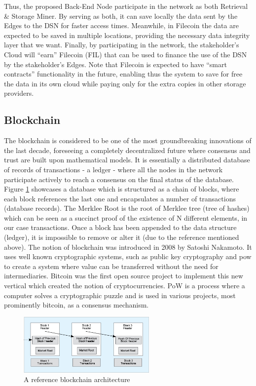Thus, the proposed Back-End Node participate in the network as both Retrieval \& Storage Miner. By serving as both, it can save locally the data sent by the Edges to the DSN for faster access times. Meanwhile, in Filecoin the data are expected to be saved in multiple locations, providing the necessary data integrity layer that we want. Finally, by participating in the network, the stakeholder’s Cloud will “earn” Filecoin (FIL) that can be used to finance the use of the DSN by the stakeholder’s Edges. Note that Filecoin is expected to have “smart contracts” functionality in the future, enabling thus the system to save for free the data in its own cloud while paying only for the extra copies in other storage providers.

\subsection{Blockchain}

The blockchain is considered to be one of the most groundbreaking innovations of the last decade, foreseeing a completely decentralized future where consensus and \gls{trust} are built upon mathematical models. It is essentially a distributed database of records of transactions - a ledger - where all the nodes in the network participate actively to reach a consensus on the final status of the database. Figure \ref{fig:blockchain} showcases a database which is structured as a chain of blocks, where each block references the last one and encapsulates a number of transactions (database records).  The Merklee Root is the root of Merklee tree (tree of hashes) which can be seen as a succinct proof of the existence of N different elements, in our case transactions. Once a block has been appended to the data structure (ledger), it is impossible to remove or alter it (due to the reference mentioned above). The notion of blockchain  was introduced in 2008 by Satoshi Nakamoto\cite{bitcoin}. It uses well known cryptographic systems, such as public key cryptography\cite{pubkey} and \acrfull{pow}\cite{bitcoin} to create a system where value can be transferred without the need for intermediaries. Bitcoin was the first open source project to implement this new vertical which created the notion of cryptocurrencies. PoW is a process where a computer solves a cryptographic puzzle and is used in various projects, most prominently bitcoin, as a consensus mechanism.

\begin{figure}[h]
    \centering
    \includegraphics[width=0.6\textwidth]{images/blockchain.jpg}
    \caption{A reference blockchain architecture\cite{opensourceforu}}
    \label{fig:blockchain}
\end{figure}

